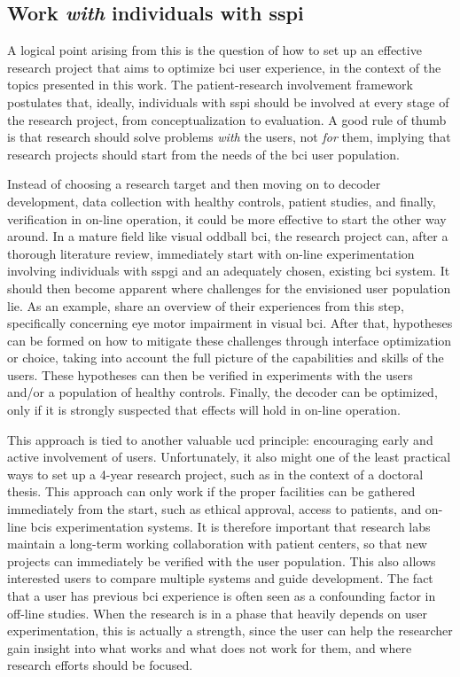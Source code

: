\subsection{Work \emph{with} individuals with \acs{sspi}}

A logical point arising from this is the question of how to set up an
effective research project that aims to optimize \ac{bci} user experience, in
the context of the topics presented in this work.
The patient-research involvement framework postulates that, ideally, individuals with
\ac{sspi} should be involved at every stage of the research project, from conceptualization
to evaluation.
A good rule of thumb is that research should solve problems \emph{with} the
users, not \emph{for} them, implying that research projects should start from
the needs of the \ac{bci} user population.

Instead of choosing a research target and then moving on to decoder
development, data collection with healthy controls, patient studies, and
finally, verification in on-line operation, it could be more effective to start
the other way around.
In a mature field like visual oddball \ac{bci}, the research project can, after
a thorough literature review, immediately start with on-line experimentation
involving individuals with \ac{sspgi} and an adequately chosen, existing \ac{bci} system.
It should then become apparent where challenges for the envisioned user
population lie.
As an example, \textcite{FriedOken2020} share an overview of their experiences from this step,
specifically concerning eye motor impairment in visual \ac{bci}.
After that, hypotheses can be formed on how to mitigate these challenges
through interface optimization or choice, taking into account the full picture
of the capabilities and skills of the users.
These hypotheses can then be verified in experiments
with the users and/or a population of healthy controls.
Finally, the decoder can be optimized, only if it is strongly suspected that
effects will hold in on-line operation.

This approach is tied to another valuable \ac{ucd} principle: encouraging early and active
involvement of users.
Unfortunately, it also might one of the least practical ways to set up
a 4-year research project, such as in the context of a doctoral thesis.
This approach can only work if the proper facilities can be gathered immediately
from the start, such as ethical approval, access to patients, and on-line \acp{bci}
experimentation systems.
It is therefore important that research labs maintain a long-term working
collaboration with patient centers, so that new projects can immediately be
verified with the user population. This also allows interested users to compare
multiple systems and guide development.
The fact that a user has previous \ac{bci} experience is often seen as a confounding
factor in off-line studies.
When the research is in a phase that heavily depends on user
experimentation, this is actually a strength, since the user can help the researcher gain
insight into what works and what does not work for them, and where research efforts
should be focused.

